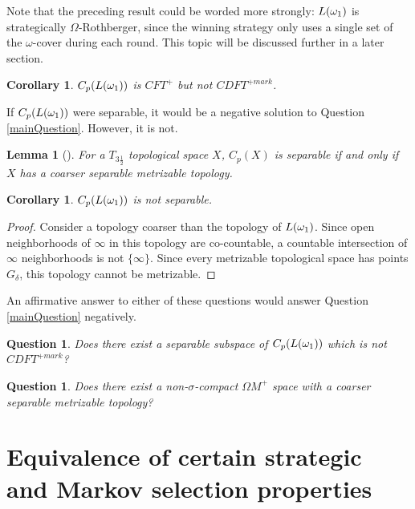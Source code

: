 \documentclass{amsart}
\theoremstyle{plain}
\newtheorem{lemma}[theorem]{Lemma}
\newtheorem{corollary}[theorem]{Corollary}
\newtheorem{question}[theorem]{Question}
\theoremstyle{definition}
\theoremstyle{remark}
\theoremstyle{plain}
\theoremstyle{definition}
\theoremstyle{remark}
\begin{document}
Note that the preceding result could be worded more strongly:
\(L(\omega_1)\)
is strategically \(\Omega\)-Rothberger, since the winning strategy only
uses a single set of the \(\omega\)-cover during each round.
This topic will be discussed further in a later section.

\begin{corollary}
  \(C_p(L(\omega_1))\) is \(CFT^+\) but not \(CDFT^{+mark}\).
\end{corollary}

If \(C_p(L(\omega_1))\) were separable, it would be a negative
solution to Question \ref{mainQuestion}. However, it is not.

\begin{lemma}[\cite{MR953314}]
  For a \(T_{3\frac{1}{2}}\) topological space \(X\),
  \(C_p(X)\) is separable if and only if \(X\) has a coarser separable
  metrizable topology.
\end{lemma}

\begin{corollary}
  \(C_p(L(\omega_1))\) is not separable.
\end{corollary}

\begin{proof}
  Consider a topology coarser than the topology of \(L(\omega_1)\).
  Since open neighborhoods of \(\infty\) in this topology are co-countable,
  a countable intersection of \(\infty\) neighborhoods is not
  \(\{\infty\}\). Since every metrizable topological space has points
  \(G_\delta\), this topology cannot be metrizable.
\end{proof}

An affirmative answer to either of these questions would answer
Question \ref{mainQuestion} negatively.

\begin{question}
  Does there exist a separable subspace of \(C_p(L(\omega_1))\)
  which is not \(CDFT^{+mark}\)?
\end{question}

\begin{question}
  Does there exist a non-\(\sigma\)-compact \(\Omega M^+\) space
  with a coarser separable metrizable topology?
\end{question}



\section{Equivalence of certain strategic and Markov selection properties}
\end{document}
